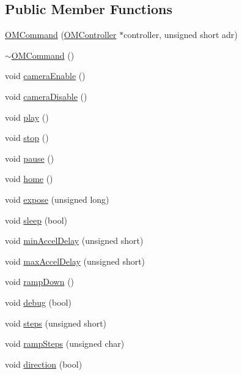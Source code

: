 \subsection*{Public Member Functions}
\begin{DoxyCompactItemize}
\item 
\hyperlink{class_o_m_command_a4309de8502be074585f5394ccca10e21}{OMCommand} (\hyperlink{class_o_m_controller}{OMController} $\ast$controller, unsigned short adr)
\item 
\hyperlink{class_o_m_command_a7dcce6f2c9f4f47d0a7eb4042c3b802c}{$\sim$OMCommand} ()
\item 
void \hyperlink{class_o_m_command_a2ad82f39f3057d972c8d65b989695888}{cameraEnable} ()
\item 
void \hyperlink{class_o_m_command_a6be90e8f9f3a6ca1bc72202b847c06b7}{cameraDisable} ()
\item 
void \hyperlink{class_o_m_command_a05f4e456e0081d9b4ebeedc7fe896dee}{play} ()
\item 
void \hyperlink{class_o_m_command_a12578b9cc0650dfc91a54e543ac1f4c8}{stop} ()
\item 
void \hyperlink{class_o_m_command_abb622e2ee5e14965011b58e1dc25a756}{pause} ()
\item 
void \hyperlink{class_o_m_command_acd98ba9e6685b63d5238f5f558f1cd0b}{home} ()
\item 
void \hyperlink{class_o_m_command_a2db56af70b4d203baba897b12fb3d931}{expose} (unsigned long)
\item 
void \hyperlink{class_o_m_command_a74794f3af8c48bc54b7dae2ac3841881}{sleep} (bool)
\item 
void \hyperlink{class_o_m_command_aa90d56c1a58c7d6b53beeae092971c84}{minAccelDelay} (unsigned short)
\item 
void \hyperlink{class_o_m_command_a15b5bc32da119b277a369d735f7a0e43}{maxAccelDelay} (unsigned short)
\item 
void \hyperlink{class_o_m_command_adc8314bfa9694ea2f1f6c1a7ed8a1fda}{rampDown} ()
\item 
void \hyperlink{class_o_m_command_a8329ee361cf2cc6214621f6ee511b97f}{debug} (bool)
\item 
void \hyperlink{class_o_m_command_a1cba427465c500cb101fd2c8173d6273}{steps} (unsigned short)
\item 
void \hyperlink{class_o_m_command_af5e4860d9cefb0c5098a70fae890fede}{rampSteps} (unsigned char)
\item 
void \hyperlink{class_o_m_command_a697e5117c035fe6af4add78396515c23}{direction} (bool)

\end{DoxyCompactItemize}
